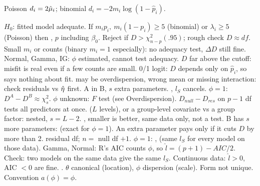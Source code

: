 \sk{} Poisson $d_i=2\hat{\mu}_i$; binomial $d_i=-2m_i\log(1-\hat p_i)$.
\par
{} $H_0$: fitted model adequate. If $m_ip_i,\ m_i(1-p_i)\ge5$ (binomial) or $\lambda_i\ge5$ (Poisson) then , $p$ including $\beta_0$. Reject if $D>\chi^2_{n-p}(.95)$; rough check $D\approx df$.  Small $m_i$ or counts (binary $m_i=1$ especially): no adequacy test, $\Delta D$ still fine. Normal, Gamma, IG: $\phi$ estimated, cannot test adequacy. $D$ far above the cutoff: misfit is real even if a few counts are small. 0/1 logit: $D$ depends only on $\hat p_i$, so says nothing about fit.
\sk{} may be overdispersion, wrong mean or missing interaction: check residuals vs $\hat{\eta}$ first.
\sk{} A in B, $s$ extra parameters. , $l_S$ cancels. $\phi=1$: $D^A-D^B\approx\chi^2_s$. $\phi$ unknown: $F$ test (see Overdispersion).  $D_{null}-D_{res}$ on $p-1$ df tests all predictors at once.  ($L$ levels), or a group-level covariate vs a group factor: nested, $s=L-2$.
\sk{} , smaller is better, same data only, not a test. B has $s$ more parameters:  (exact for $\phi=1$). An extra parameter pays only if it cuts $D$ by more than 2.
\sk{} residual df; $n=$ null df $+1$. $\phi=1$: ,  (same $l_S$ for every model on those data). Gamma, Normal: R's AIC counts $\phi$, so $\hat l=(p+1)-AIC/2$. Check: two models on the same data give the same $l_S$. Continuous data: $\hat l>0$, AIC $<0$ are fine.
\bx
{} . $\theta$ canonical (location), $\phi$ dispersion (scale). Form not unique. Convention $a(\phi)=\phi$.

